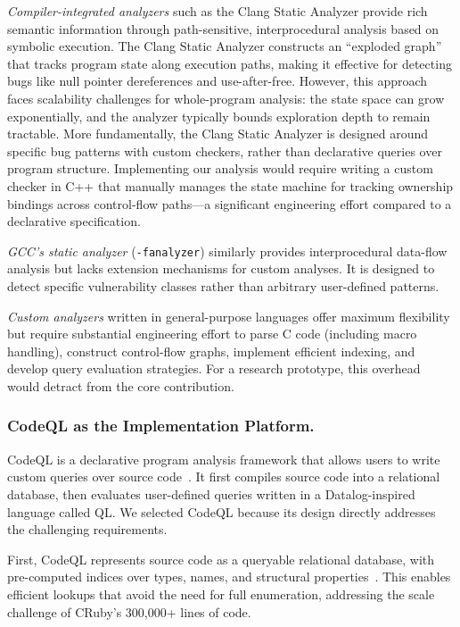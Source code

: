 \emph{Compiler-integrated analyzers} such as the Clang Static Analyzer provide rich semantic information through path-sensitive, interprocedural analysis based on symbolic execution. The Clang Static Analyzer constructs an ``exploded graph'' that tracks program state along execution paths, making it effective for detecting bugs like null pointer dereferences and use-after-free. However, this approach faces scalability challenges for whole-program analysis: the state space can grow exponentially, and the analyzer typically bounds exploration depth to remain tractable. More fundamentally, the Clang Static Analyzer is designed around specific bug patterns with custom checkers, rather than declarative queries over program structure. Implementing our analysis would require writing a custom checker in C++ that manually manages the state machine for tracking ownership bindings across control-flow paths---a significant engineering effort compared to a declarative specification.

\emph{GCC's static analyzer} (\texttt{-fanalyzer}) similarly provides interprocedural data-flow analysis but lacks extension mechanisms for custom analyses. It is designed to detect specific vulnerability classes rather than arbitrary user-defined patterns.

\emph{Custom analyzers} written in general-purpose languages offer maximum flexibility but require substantial engineering effort to parse C code (including macro handling), construct control-flow graphs, implement efficient indexing, and develop query evaluation strategies. For a research prototype, this overhead would detract from the core contribution.

\subsubsection*{CodeQL as the Implementation Platform.}
CodeQL is a declarative program analysis framework that allows users to write custom queries over source code~\cite{codeql_about}. It first compiles source code into a relational database, then evaluates user-defined queries written in a Datalog-inspired language called QL. We selected CodeQL because its design directly addresses the challenging requirements.

First, CodeQL represents source code as a queryable relational database, with pre-computed indices over types, names, and structural properties~\cite{ql_ecoop}. This enables efficient lookups that avoid the need for full enumeration, addressing the scale challenge of CRuby's 300,000+ lines of code.

